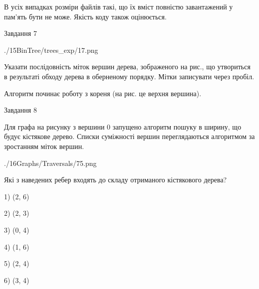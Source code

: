 \documentclass[12pt, ukrainian]{article}
\begin{document}
{В усіх випадках розміри файлів такі, що їх вміст повністю завантажений у пам'ять бути не може. Якість коду також оцінюється.



\vspace{10mm}\par

\newpage
\begin{minipage}[t]{9.7cm}
               
{\begin{center}Завдання {7}\end{center}}
\vspace{-6mm}

\begin{center}
	{./15BinTree/trees_exp/17.png}
\end{center}
Указати послідовність міток вершин дерева, зображеного на рис., що утвориться в результаті обходу дерева в оберненому порядку. Мітки записувати через пробіл.\par Алгоритм починає роботу з кореня (на рис. це верхня вершина).\par

\end{minipage}
\vline \hspace{8mm}
\begin{minipage}[t]{8.0cm}
               
{\begin{center}Завдання {8}\end{center}}
\vspace{-6mm}
Для графа на рисунку з вершини 0 запущено алгоритм пошуку в ширину, що будує кістякове дерево. Списки суміжності вершин переглядаються алгоритмом за зростанням міток вершин.\par
\begin{center}
	{./16Graphs/Traversals/75.png}
\end{center}
\par Які з наведених ребер входять до складу отриманого кістякового дерева?\par
1) (2, 6)\par
2) (2, 3)\par
3) (0, 4)\par
4) (1, 6)\par
5) (2, 4)\par
6) (3, 4)\par
{\vskip 15pt} \par


\end{minipage}}
\end{document}
